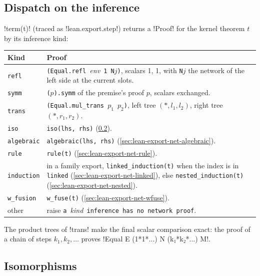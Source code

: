 {\subsection{Dispatch on the inference}\label{sec:lean-export-net-term}

\py!term(t)! (traced as \code!lean.export.step!) returns a \py!Proof! for the kernel theorem $t$
by its inference kind:

\begin{xltabular}{\linewidth}{@{}p{2.3cm}X@{}}
\toprule
Kind & Proof \\
\midrule
\texttt{refl} & \texttt{(Equal.refl }\textit{env}\texttt{ 1 N}$j$\texttt{)}, scalars 1, 1, with
  \texttt{N}$j$ the network of the left side at the current slots. \\
\texttt{symm} & \texttt{(}$p$\texttt{).symm} of the premise's proof $p$, scalars exchanged. \\
\texttt{trans} & \texttt{(Equal.mul\_\allowbreak{}trans }$p_1$\texttt{ }$p_2$\texttt{)}, left tree
  $(\ast, l_1, l_2)$, right tree $(\ast, r_1, r_2)$. \\
\texttt{iso} & \texttt{iso(lhs, rhs)} (\cref{sec:lean-export-net-iso}). \\
\texttt{algebraic} & \texttt{algebraic(lhs, rhs)} (\cref{sec:lean-export-net-algebraic}). \\
\texttt{rule} & \texttt{rule(t)} (\cref{sec:lean-export-net-rule}). \\
\texttt{induction} & in a family export, \texttt{linked\_\allowbreak{}induction(t)} when the index is in
  \texttt{linked} (\cref{sec:lean-export-net-linked}), else \texttt{nested\_\allowbreak{}induction(t)}
  (\cref{sec:lean-export-net-nested}). \\
\texttt{w\_\allowbreak{}fusion} & \texttt{w\_\allowbreak{}fuse(t)} (\cref{sec:lean-export-net-wfuse}). \\
other & raise \texttt{a }\textit{kind}\texttt{ inference has no network proof}. \\
\bottomrule
\end{xltabular}

\noindent The product trees of \code!trans! make the final scalar comparison exact: the proof of
a chain of steps $k_1, k_2, \dots$ proves \lean!Equal E (1*1*...) N (k₁*k₂*...) M!.

\subsection{Isomorphisms}\label{sec:lean-export-net-iso}

}
